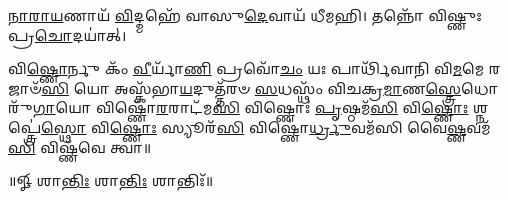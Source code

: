 \-\ul{𑌨𑌾}\-\-\ul{𑌰𑌾}\-\-\ul{𑌯}\-𑌣𑌾𑌯᳴ \ul{𑌵𑌿}\-𑌦𑍍𑌮𑌹𑍇᳴ 𑌵𑌾𑌸𑍁\-\ul{𑌦𑍇}\-𑌵𑌾𑌯᳴ 𑌧𑍀𑌮𑌹𑌿। 𑌤𑌨𑍍𑌨𑍋᳴ 𑌵𑌿𑌷𑍍𑌣𑍁𑌃 𑌪𑍍𑌰\-\ul{𑌚𑍋}\-𑌦𑌯𑌾॑𑌤𑍍। 

𑌵𑌿\-\ul{𑌷𑍍𑌣𑍋}\-𑌰𑍍𑌨𑍁 𑌕𑌂᳴ \ul{𑌵𑍀}\-𑌰𑍍𑌯𑌾᳴\-\ul{𑌣𑌿} 𑌪𑍍𑌰𑌵𑍋᳴\-\ul{𑌚𑌂} 𑌯𑌃 𑌪𑌾𑌰𑍍𑌥𑌿᳴𑌵𑌾𑌨𑌿 𑌵𑌿\-\ul{𑌮}\-𑌮𑍇 𑌰𑌜𑌾𑍞᳴\-\ul{𑌸𑌿} 𑌯𑍋 𑌅𑌸𑍍𑌕᳴𑌭𑌾\-\ul{𑌯}\-𑌦𑍁𑌤𑍍𑌤᳴𑌰𑍞 \ul{𑌸}\-𑌧𑌸𑍍𑌥𑌂᳴ 𑌵𑌿𑌚𑌕𑍍𑌰\-\ul{𑌮𑌾}\-𑌣\-\ul{𑌸𑍍𑌤𑍍𑌰𑍇}\-𑌧𑍋𑌰𑍁᳴\-\ul{𑌗𑌾}\-𑌯𑍋 𑌵𑌿𑌷𑍍𑌣𑍋᳴\-\ul{𑌰}\-𑌰𑌾𑌟᳴𑌮\-\ul{𑌸𑌿} 𑌵𑌿𑌷𑍍𑌣𑍋𑌃॑ \ul{𑌪𑍃}\-𑌷𑍍𑌠𑌮᳴\-\ul{𑌸𑌿} 𑌵𑌿\-\ul{𑌷𑍍𑌣𑍋𑌃} 𑌶𑍍𑌨𑌪𑍍𑌤𑍍𑌰𑍇॑\-\ul{𑌸𑍍𑌥𑍋} 𑌵𑌿\-\ul{𑌷𑍍𑌣𑍋𑌃} 𑌸𑍍𑌯𑍂𑌰᳴\-\ul{𑌸𑌿} 𑌵𑌿𑌷𑍍𑌣𑍋॑\-\ul{𑌰𑍍𑌧𑍍𑌰𑍁}\-𑌵𑌮᳴𑌸𑌿 𑌵𑍈\-\ul{𑌷𑍍𑌣}\-𑌵𑌮᳴\-\ul{𑌸𑌿} 𑌵𑌿𑌷𑍍𑌣᳴𑌵𑍇 𑌤𑍍𑌵𑌾॥ 

\centerline{॥𑍐 𑌶𑌾\-\ul{𑌨𑍍𑌤𑌿𑌃} 𑌶𑌾\-\ul{𑌨𑍍𑌤𑌿𑌃} 𑌶𑌾𑌨𑍍𑌤𑌿𑌃᳴॥}
